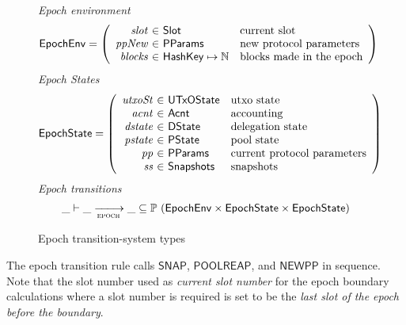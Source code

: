 \begin{figure}[htb]
  \emph{Epoch environment}
  \begin{equation*}
    \EpochEnv =
    \left(
      \begin{array}{r@{~\in~}ll}
        \var{slot} & \Slot & \text{current slot}\\
        \var{ppNew} & \PParams & \text{new protocol parameters}\\
        \var{blocks} & \HashKey \mapsto \N & \text{blocks made in the epoch}\\
      \end{array}
    \right)
  \end{equation*}
  \emph{Epoch States}
  \begin{equation*}
    \EpochState =
    \left(
      \begin{array}{r@{~\in~}ll}
        \var{utxoSt} & \UTxOState & \text{utxo state}\\
        \var{acnt} & \Acnt & \text{accounting}\\
        \var{dstate} & \DState & \text{delegation state}\\
        \var{pstate} & \PState & \text{pool state}\\
        \var{pp} & \PParams & \text{current protocol parameters}\\
        \var{ss} & \Snapshots & \text{snapshots}\\
      \end{array}
    \right)
  \end{equation*}
  \emph{Epoch transitions}
  \begin{equation*}
    \_ \vdash
    \var{\_} \trans{epoch}{} \var{\_}
    \subseteq \powerset (\EpochEnv \times \EpochState \times \EpochState)
  \end{equation*}
  \caption{Epoch transition-system types}
  \label{fig:ts-types:epoch}
\end{figure}


The epoch transition rule calls $\mathsf{SNAP}$, $\mathsf{POOLREAP}$, and $\mathsf{NEWPP}$
in sequence.
Note that the slot number used as \textit{current slot number}
for the epoch boundary calculations where a slot number is required is set to
be the \textit{last slot of the epoch before the boundary}.


